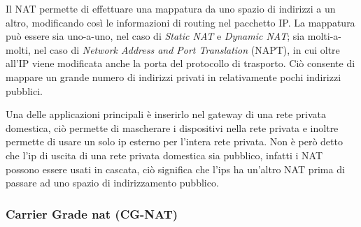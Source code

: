 Il NAT \cite{RFC_1631} permette di effettuare una mappatura da uno spazio di indirizzi a un altro, modificando così le informazioni di routing nel pacchetto IP. La mappatura può essere sia uno-a-uno, nel caso di \textit{Static NAT} e \textit{Dynamic NAT}; sia molti-a-molti, nel caso di \textit{Network Address and Port Translation} (NAPT), in cui oltre all'IP viene modificata anche la porta del protocollo di trasporto. Ciò consente di mappare un grande numero di indirizzi privati in relativamente pochi indirizzi pubblici. 

Una delle applicazioni principali è inserirlo nel gateway di una rete privata domestica, ciò permette di mascherare i dispositivi nella rete privata e inoltre permette di usare un solo ip esterno per l'intera rete privata. Non è però detto che l'ip di uscita di una rete privata domestica sia pubblico, infatti i NAT possono essere usati in cascata, ciò significa che l'ips ha un'altro NAT prima di passare ad uno spazio di indirizzamento pubblico.

\subsubsection{Carrier Grade nat (CG-NAT)}

